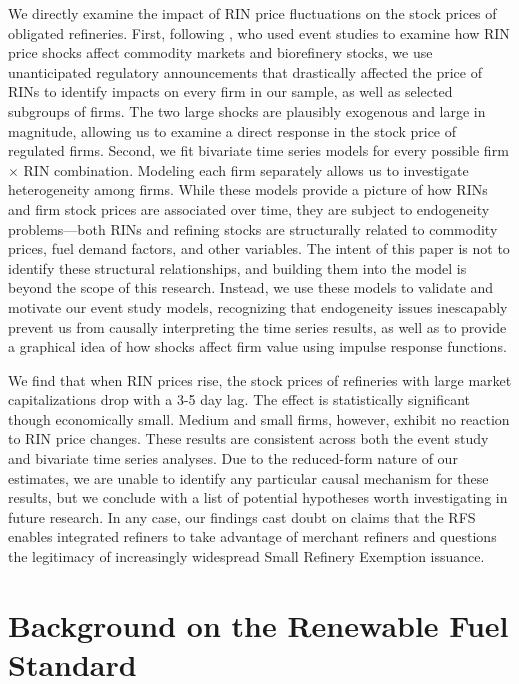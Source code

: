 \documentclass[11pt]{article}
\begin{document}
We directly examine the impact of RIN price fluctuations on the stock prices of obligated refineries. First, following \cite{Lade2018a}, who used event studies to examine how RIN price shocks affect commodity markets and biorefinery stocks, we use unanticipated regulatory announcements that drastically affected the price of RINs to identify impacts on every firm in our sample, as well as selected subgroups of firms. The two large shocks are plausibly exogenous and large in magnitude, allowing us to examine a direct response in the stock price of regulated firms. Second, we fit bivariate time series models for every possible firm $\times$ RIN combination. Modeling each firm separately allows us to investigate heterogeneity among firms. While these models provide a picture of how RINs and firm stock prices are associated over time, they are subject to endogeneity problems---both RINs and refining stocks are structurally related to commodity prices, fuel demand factors, and other variables. The intent of this paper is not to identify these structural relationships, and building them into the model is beyond the scope of this research. Instead, we use these models to validate and motivate our event study models, recognizing that endogeneity issues inescapably prevent us from causally interpreting the time series results, as well as to provide a graphical idea of how shocks affect firm value using impulse response functions.

We find that when RIN prices rise, the stock prices of refineries with large market capitalizations drop with a 3-5 day lag. The effect is statistically significant though economically small. Medium and small firms, however, exhibit no reaction to RIN price changes. These results are consistent across both the event study and bivariate time series analyses. Due to the reduced-form nature of our estimates, we are unable to identify any particular causal mechanism for these results, but we conclude with a list of potential hypotheses worth investigating in future research. In any case, our findings cast doubt on claims that the RFS enables integrated refiners to take advantage of merchant refiners and questions the legitimacy of increasingly widespread Small Refinery Exemption issuance.

\section{Background on the Renewable Fuel Standard}
\end{document}
